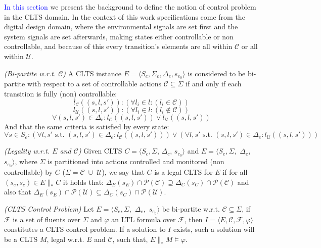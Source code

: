 \textcolor{blue}{In this section} we present the background to define the notion of control problem in the CLTS domain.  In the context of this work specifications come from the digital design domain, where the environmental signals are set first and the system signals are set afterwards, making states either controllable or non controllable, and because of this every transition's elements are all within $\mathcal{C}$ or all within $\mathcal{U}$. 

\begin{definition}\label{def:bi-partite_clts} \emph{(Bi-partite w.r.t. $\mathcal{C}$)} 
A CLTS instance $E=\langle S_e, \Sigma_e, \Delta_e, s_{e_0} \rangle$ is considered to be bi-partite with respect to a set of controllable actions $\mathcal{C} \subseteq \Sigma$ if and only if each transition is fully (non) controllable:
\[ l_{\mathcal{C}}((s,l,s')): ( \forall l_i \in l:(l_i \in \mathcal{C}))\]
\[ l_{\mathcal{U}}((s,l,s')): ( \forall l_i \in l:(l_i \not\in \mathcal{C}))\]
\[ \forall (s,l,s') \in \Delta_e: l_{\mathcal{C}}((s,l,s')) \vee l_{\mathcal{U}}((s,l,s')) \]
And that the same criteria is satisfied by every state:
\[ \forall s \in S_e : (\forall l, s' \text{ s.t. } (s,l,s') \in \Delta_e:l_{\mathcal{C}}((s,l,s')))\vee (\forall l, s' \text{ s.t. } (s,l,s') \in \Delta_e:l_{\mathcal{U}}((s,l,s')))\]
\end{definition}

\begin{definition}
	\label{def:legal_clts} \emph{(Legality w.r.t. $E$ and $\mathcal{C}$)} 
	Given CLTS $C = \langle S_c, \Sigma$, $\Delta_c$, $s_{c_0}\rangle$ and $E = \langle S_e,\Sigma,$ $\Delta_e,$ $s_{e_0}\rangle$, where $\Sigma$ is partitioned into actions controlled and monitored (non controllable) by $C$ ($\Sigma=\mathcal{C} \; \cup \;\mathcal{U}$), we say that $C$ is a legal CLTS for $E$ if for all $(s_e,s_c) \in E \parallel_* C$ it holds that:
	$\Delta_{E}(s_E)\cap \mathcal{P}(\mathcal{C}) \supseteq \Delta_{C}(s_C)\cap \mathcal{P}(\mathcal{C})$ and also that  $\Delta_{E}(s_E)\cap \mathcal{P}(\mathcal{U}) \subseteq \Delta_{C}(s_C)\cap \mathcal{P}(\mathcal{U})$.
\end{definition}

\begin{definition}
	\label{def:clts_control_problem} \emph{(CLTS Control Problem)} 
	Let $E = \langle S_e,\Sigma,$ $\Delta_e,$ $s_{e_0}\rangle $ be bi-partite w.r.t. $\mathcal{C} \subseteq \Sigma$, if $\mathcal{F}$ is a set of fluents over $\Sigma$ and $\varphi$ an LTL formula over $\mathcal{F}$, then $I = \langle E, \mathcal{C}, \mathcal{F}, \varphi \rangle$ constitutes a CLTS control problem. If a solution to $I$ exists, such a solution will be a CLTS $M$, legal w.r.t. $E$ and $\mathcal{C}$, such that, $E \parallel_* M \models \varphi$.
\end{definition}
